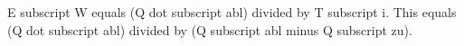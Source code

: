 E subscript W equals (Q dot subscript abl) divided by T subscript i. This equals (Q dot subscript abl) divided by (Q subscript abl minus Q subscript zu).
